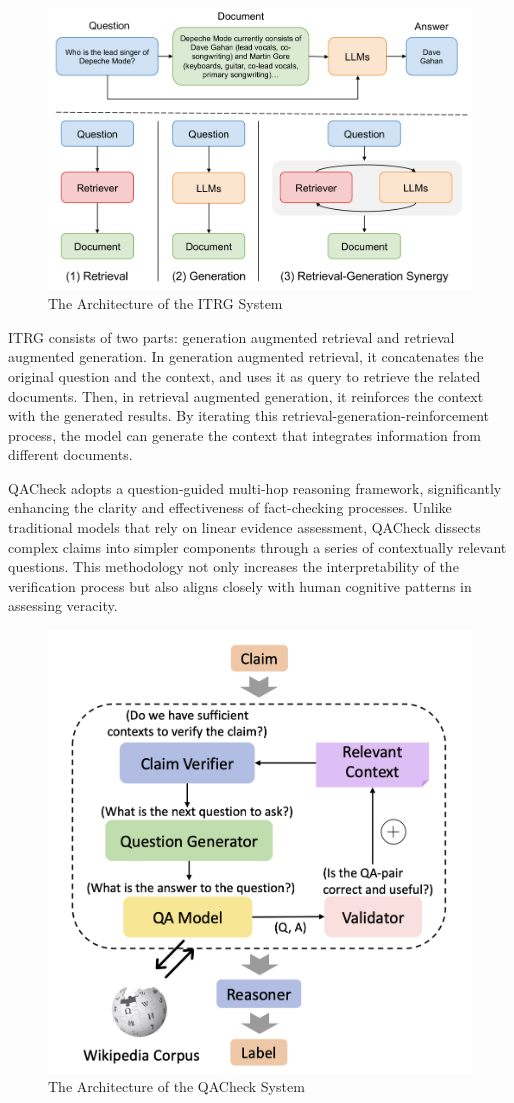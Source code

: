 \documentclass{article}
\begin{document}
\begin{figure}[h]
  \centering
  \includegraphics[width=0.6\linewidth]{Figure/itrg.png}
  \caption{The Architecture of the ITRG System}
\end{figure}

ITRG consists of two parts: generation augmented retrieval and retrieval augmented generation. In generation augmented retrieval, it concatenates the original question and the context, and uses it as query to retrieve the related documents. Then, in retrieval augmented generation, it reinforces the context with the generated results. By iterating this retrieval-generation-reinforcement process, the model can generate the context that integrates information from different documents.
\par

QACheck \cite{pan2023qacheck} adopts a question-guided multi-hop reasoning framework, significantly enhancing the clarity and effectiveness of fact-checking processes. Unlike traditional models that rely on linear evidence assessment, QACheck dissects complex claims into simpler components through a series of contextually relevant questions. This methodology not only increases the interpretability of the verification process but also aligns closely with human cognitive patterns in assessing veracity. \par

\begin{figure}[h]
  \centering
  \includegraphics[width=0.4\linewidth]{Figure/Fig3.png}
  \caption{The Architecture of the QACheck System}
\end{figure}
\end{document}
